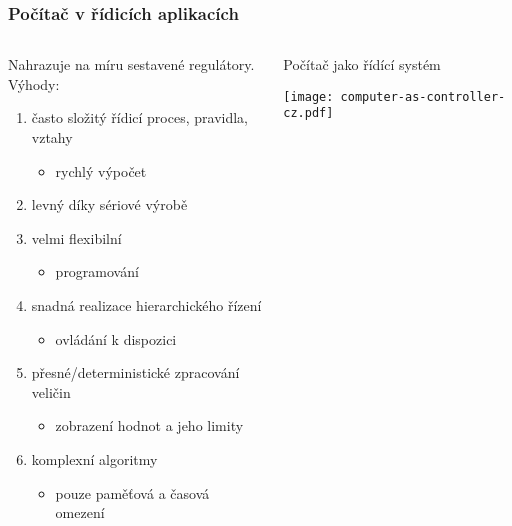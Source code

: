 \documentclass{beamer}
\begin{document}
\begin{frame}
\frametitle{Počítač v řídicích aplikacích}

\begin{columns}
\begin{column}{0.58\textwidth}
Nahrazuje na míru sestavené regulátory. Výhody:
\begin{enumerate}
 \item často složitý řídicí proces, pravidla, vztahy
 \begin{itemize}
   \item rychlý výpočet
 \end{itemize}
 \item levný díky sériové výrobě
 \item velmi flexibilní
 \begin{itemize}
   \item programování
 \end{itemize}
 \item snadná realizace hierarchického řízení
 \begin{itemize}
   \item ovládání k dispozici
 \end{itemize}
 \item přesné/deterministické zpracování veličin
 \begin{itemize}
   \item zobrazení hodnot a jeho limity 
 \end{itemize}
 \item komplexní algoritmy
 \begin{itemize}
   \item pouze paměťová a časová omezení
 \end{itemize}
\end{enumerate}
  \vfil
\end{column}
\begin{column}{0.42\textwidth}
  \begin{center}
    Počítač jako řídící systém

    \vspace{5mm}

    \texttt{[image: computer-as-controller-cz.pdf]}
  \end{center}
\end{column}
\end{columns}
\end{frame}
\end{document}

